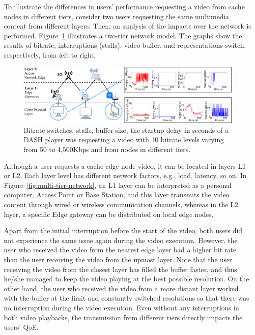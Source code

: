 To illustrate the differences in users' performance requesting a video from cache nodes in different tiers, consider two users requesting the same multimedia content from different layers. Then, an analysis of the impacts over the network is performed. Figure~\ref{fig:impact-two-layers} illustrates a two-tier network model. The graphs show the results of bitrate, interruptions (stalls), video buffer, and representations switch, respectively, from left to right.%
\begin{figure}[htp!]
    \centering
    \includegraphics[width=\linewidth]{images/qoe-multi-level-3.pdf}
    \caption{Bitrate switches, stalls, buffer size, the startup delay in seconds of a DASH player was requesting a video with 10 bitrate levels varying from 50 to 4,500Kbps and from nodes in different tiers.}
    \label{fig:impact-two-layers}
\end{figure}
Although a user requests a cache edge node video, it can be located in layers L1 or L2. Each layer level has different network factors, e.g., load, latency, so on. In Figure~\ref{fig:multi-tier-network}, an L1 layer can be interpreted as a personal computer, Access Point or Base Station, and this layer transmits the video content through wired or wireless communication channels, whereas in the L2 layer, a specific Edge gateway can be distributed on local edge nodes.

Apart from the initial interruption before the start of the video, both users did not experience the same issue again during the video execution. However, the user who received the video from the nearest edge layer had a higher bit rate than the user receiving the video from the upmost layer.
Note that the user receiving the video from the closest layer has filled the buffer faster, and thus he/she managed to keep the video playing at the best possible resolution.
On the other hand, the user who received the video from a more distant layer worked with the buffer at the limit and constantly switched resolutions so that there was no interruption during the video execution. Even without any interruptions in both video playbacks, the transmission from different tiers directly impacts the users' QoE.


